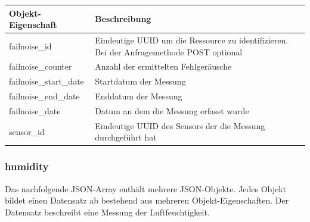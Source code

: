 \begin{table}[H]
  \begin{tabularx}{\textwidth}{lX}
    \textbf{Objekt-Eigenschaft} & \textbf{Beschreibung}                                                                     \\ \toprule
    failnoise\_id               & Eindeutige UUID um die Ressource zu identifizieren. Bei der Anfragemethode POST optional  \\
    failnoise\_counter          & Anzahl der ermittelten Fehlgeräusche                                                      \\
    failnoise\_start\_date      & Startdatum der Messung                                                                    \\
    failnoise\_end\_date        & Enddatum der Messung                                                                      \\
    failnoise\_date             & Datum an dem die Messung erfasst wurde                                                    \\
    sensor\_id                  & Eindeutige UUID des Sensors der die Messung durchgeführt hat                              \\
  \end{tabularx}
\end{table}

\subsubsection{humidity}%
\label{sec:rest.json.humidity}
Das nachfolgende JSON-Array enthält mehrere JSON-Objekte. Jedes Objekt bildet einen Datensatz ab bestehend aus mehreren Objekt-Eigenschaften. Der Datensatz beschreibt eine Messung der Luftfeuchtigkeit.

\begin{jsoncode}
\end{jsoncode}

